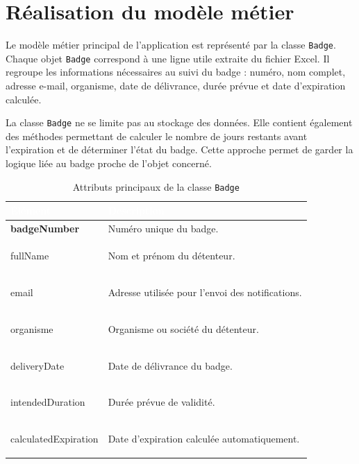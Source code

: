 \documentclass[12pt,a4paper,openany]{report}
\begin{document}
\section{Réalisation du modèle métier}

Le modèle métier principal de l'application est représenté par la classe
\texttt{Badge}. Chaque objet \texttt{Badge} correspond à une ligne utile extraite
du fichier Excel. Il regroupe les informations nécessaires au suivi du badge :
numéro, nom complet, adresse e-mail, organisme, date de délivrance, durée prévue
et date d'expiration calculée.

La classe \texttt{Badge} ne se limite pas au stockage des données. Elle contient
également des méthodes permettant de calculer le nombre de jours restants avant
l'expiration et de déterminer l'état du badge. Cette approche permet de garder la
logique liée au badge proche de l'objet concerné.

\begin{table}[H]
\centering
\small
\renewcommand{\arraystretch}{1.5}
\setlength{\arrayrulewidth}{1pt}

\begin{tabularx}{\textwidth}{|>{\raggedright\arraybackslash\bfseries\ttfamily}p{}|>{\raggedright\arraybackslash}X|}
\hline
\rowcolor{ondaBlue} 
\textcolor{white}{\textbf{\textsf{Élément}}} & \textcolor{white}{\textbf{\textsf{Description}}} \\
\hline

\rowcolor{ondaBlue!5} 
badgeNumber & Numéro unique du badge. \\
\hline

fullName & Nom et prénom du détenteur. \\
\hline

\rowcolor{ondaBlue!5} 
email & Adresse utilisée pour l'envoi des notifications. \\
\hline

organisme & Organisme ou société du détenteur. \\
\hline

\rowcolor{ondaBlue!5} 
deliveryDate & Date de délivrance du badge. \\
\hline

intendedDuration & Durée prévue de validité. \\
\hline

\rowcolor{ondaBlue!5} 
calculatedExpiration & Date d'expiration calculée automatiquement. \\
\hline

\end{tabularx}
\caption{Attributs principaux de la classe \texttt{Badge}}
\label{tab:attributs-badge}
\end{table}
\end{document}
